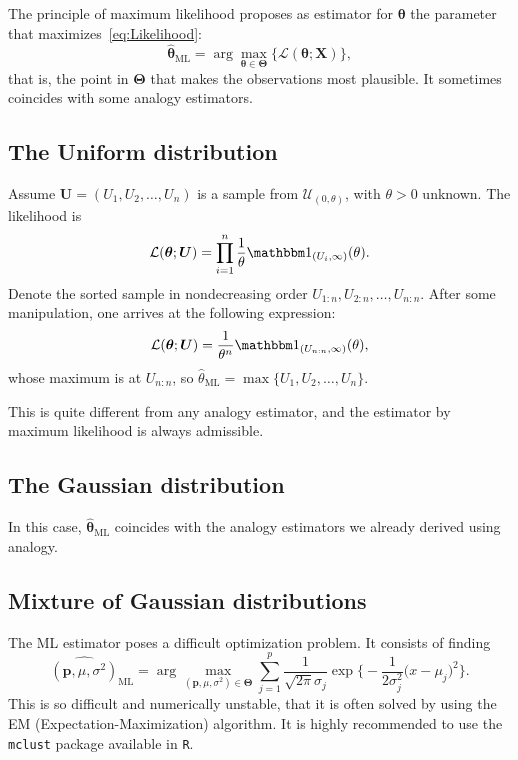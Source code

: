 The principle of maximum likelihood proposes as estimator for $\bm \theta$ the parameter that maximizes~\eqref{eq:Likelihood}:
\begin{equation}
\widehat{\bm \theta}_{\text{ML}} = \arg\max_{\bm\theta\in\bm{\Theta}}
\Big\{ \mathcal L(\bm \theta;\bm X)
\Big\},
\end{equation}
that is, the point in $\bm \Theta$ that makes the observations most plausible.
It sometimes coincides with some analogy estimators.

\subsection{The Uniform distribution}

Assume $\bm U=(U_1,U_2,\dots, U_n)$ is a sample from $\mathcal U_{(0,\theta)}$, with $\theta>0$ unknown.
The likelihood is
\begin{equation}
\mathcal L(\bm \theta;\bm U) = \prod_{i=1}^{n} \frac1\theta \mathbbm 1_{(U_i,\infty)}(\theta).
\label{eq:LikelihoodUniform}
\end{equation}
Denote the sorted sample in nondecreasing order $U_{1:n},U_{2:n},\dots,U_{n:n}$.
After some manipulation, one arrives at the following expression:
\begin{equation}
\mathcal L(\bm \theta;\bm U) = \frac1{\theta^n} \mathbbm 1_{(U_{n:n},\infty)} (\theta),
\label{eq:LikelihoodUniformReady}
\end{equation}
whose maximum is at $U_{n:n}$, so 
$\widehat{\theta}_{\text{ML}}=\max \{U_1,U_2,\dots,U_n\}$.

This is quite different from any analogy estimator, and the estimator by maximum likelihood is always admissible.

\subsection{The Gaussian distribution}

In this case, $\widehat{\bm\theta}_{\text{ML}}$ coincides with the analogy estimators we already derived using analogy.

\subsection{Mixture of Gaussian distributions}

The ML estimator poses a difficult optimization problem.
It consists of finding
\begin{equation}
\widehat{(\bm p,\mu,\sigma^2)}_{\text{ML}} = \arg\max_{(\bm p,\mu,\sigma^2)\in\bm{\Theta}}
\sum_{j=1}^{p}
\frac{1}{\sqrt{2\pi}\sigma_j} \exp\Big\{
-\frac{1}{2\sigma_j^2} \big(x - \mu_j)^2 \Big\}.
\end{equation}
This is so difficult and numerically unstable, that it is often solved by using the EM (Expectation-Maximization) algorithm.
It is highly recommended to use the \texttt{mclust} package\cite{mclust4} available in \texttt{R}\cite{Rmanual}.

